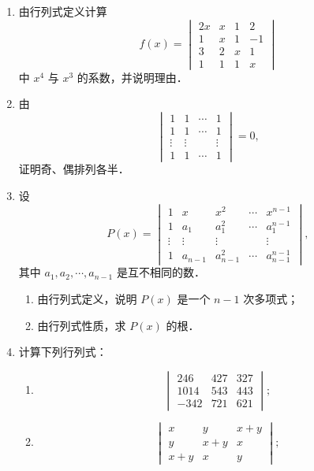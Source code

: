 \begin{enumerate}
\[\begin{vmatrix}
      d_1&d_2&0&0&0\\
      e_1&e_2&0&0&0
    \end{vmatrix}=0.
  \]
  \ansproof
  \item 由行列式定义计算
  \[
    f(x)=
    \begin{vmatrix}
      2x&x&1&2\\
      1&x&1&-1\\
      3&2&x&1\\
      1&1&1&x
    \end{vmatrix}
  \]
  中 $x^4$ 与 $x^3$ 的系数，并说明理由．
  \anscompute
  \item 由
  \[
    \begin{vmatrix}
      1&1&\cdots&1\\
      1&1&\cdots&1\\
      \vdots&\vdots&&\vdots\\
      1&1&\cdots&1
    \end{vmatrix}=0,
  \]
  证明奇、偶排列各半．
  \ansproof
  \item 设
  \[
    P(x)=
    \begin{vmatrix}
      1&x&x^2&\cdots&x^{n-1}\\
      1&a_1&a_1^2&\cdots&a_1^{n-1}\\
      \vdots&\vdots&\vdots&&\vdots\\
      1&a_{n-1}&a_{n-1}^2&\cdots&a_{n-1}^{n-1}
    \end{vmatrix},
  \]
  其中 $a_1,a_2,\cdots,a_{n-1}$ 是互不相同的数．
  \begin{enumerate}
    \item 由行列式定义，说明 $P(x)$ 是一个 $n-1$ 次多项式；
  \anssub
    \item 由行列式性质，求 $P(x)$ 的根．
  \anssub
  \end{enumerate}
  \item 计算下列行列式：
  \begin{enumerate}
    \item \[
    \begin{vmatrix}
      246&427&327\\
      1014&543&443\\
      -342&721&621
    \end{vmatrix};
    \]
  \anssub
    \item \[
    \begin{vmatrix}
      x&y&x+y\\
      y&x+y&x\\
      x+y&x&y
    \end{vmatrix};
\]
\end{enumerate}
\end{enumerate}
